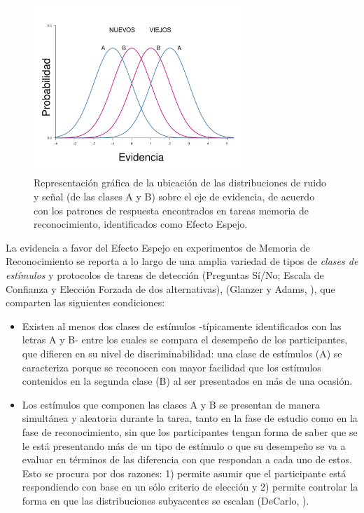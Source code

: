\begin{figure}[th]
\centering
\includegraphics[width=0.7\textwidth]{Figures/EfectoEspejo}
\caption[Efecto Espejo: Las distribuciones de ruido y señal A y B se reflejan entre sí]{Representación gráfica de la ubicación de las distribuciones de ruido y señal (de las clases A y B) sobre el eje de evidencia, de acuerdo con los patrones de respuesta encontrados en tareas memoria de reconocimiento, identificados como Efecto Espejo.}
\label{fig:Ejem_EfectoEspejo}
\end{figure}

La evidencia a favor del Efecto Espejo en experimentos de Memoria de Reconocimiento se reporta a lo largo de una amplia variedad de tipos de \textit{clases de estímulos} y protocolos de tareas de detección (Preguntas Sí/No; Escala de Confianza y Elección Forzada de dos alternativas), (Glanzer y Adams, \citeyear{Glanzer1990}), que comparten las siguientes condiciones:\\

\begin{itemize}
\item Existen al menos dos clases de estímulos -típicamente identificados con las letras A y B- entre los cuales se compara el desempeño de los participantes, que difieren en su nivel de discriminabilidad: una clase de estímulos (A) se caracteriza porque se reconocen con mayor facilidad que los estímulos contenidos en la segunda clase (B) al ser presentados en más de una ocasión.\\

\item Los estímulos que componen las clases A y B se presentan de manera simultánea y aleatoria durante la tarea, tanto en la fase de estudio como en la fase de reconocimiento, sin que los participantes tengan forma de saber que se le está presentando más de un tipo de estímulo o  que su desempeño se va a evaluar en términos de las diferencia con que respondan a cada uno de estos. Esto se procura por dos razones: 1) permite asumir que el participante está respondiendo con base en un sólo criterio de elección y 2) permite controlar la forma en que las distribuciones subyacentes se escalan (DeCarlo, \citeyear{DeCarlo2007}).\\
\end{itemize}

